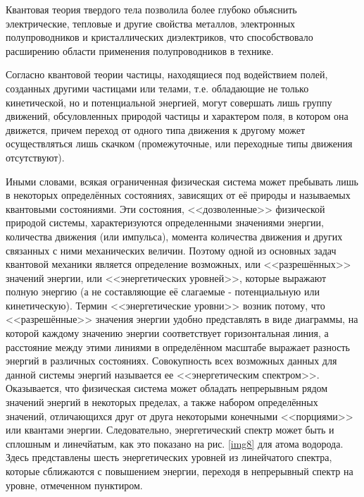 \documentclass[a4paper,10pt]{book}
\begin{document}
Квантовая теория твердого тела позволила более глубоко объяснить электрические, тепловые и другие свойства металлов, электронных полупроводников и кристаллических диэлектриков, что способствовало расширению области применения полупроводников в технике.

Согласно квантовой теории частицы, находящиеся под водействием полей, созданных другими частицами или телами, т.е. обладающие не только кинетической, но и потенциальной энергией, могут совершать лишь группу движений, обсуловленных природой частицы и характером поля, в котором она движется, причем переход от одного типа движения к другому может осуществляться лишь скачком (промежуточные, или переходные типы движения отсутствуют).

Иными словами, всякая ограниченная физическая система может пребывать лишь в некоторых определённых состояниях, зависящих от её природы и называемых квантовыми состояниями. Эти состояния, <<дозволенные>> физической природой системы, характеризуются определенными значениями энергии, количества движения (или импульса), момента количества движения и других связанных с ними механических величин. Поэтому одной из основных задач квантовой механики является определение возможных, или <<разрешённых>> значений энергии, или <<энергетических уровней>>, которые выражают полную энергию (а не составляющие её слагаемые - потенциальную или кинетическую). Термин <<энергетические уровни>> возник потому, что <<разрешённые>> значения энергии удобно представлять в виде диаграммы, на которой каждому значению энергии соответствует горизонтальная линия, а расстояние между этими линиями в определённом масштабе выражает разность энергий в различных состояниях. Совокупность всех возможных данных для данной системы энергий называется ее <<энергетическим спектром>>. Оказывается, что физическая система может обладать непрерывным рядом значений энергий в некоторых пределах, а также набором определённых значений, отличающихся друг от друга некоторыми конечными <<порциями>> или квантами энергии. 
Следовательно, энергетический спектр может быть и сплошным и линечйатым, как это показано на рис. \ref{img8} для атома водорода. Здесь представлены шесть энергетических уровней из линейчатого спектра, которые сближаются с повышением энергии, переходя в непрерывный спектр на уровне, отмеченном пунктиром.
\end{document}
